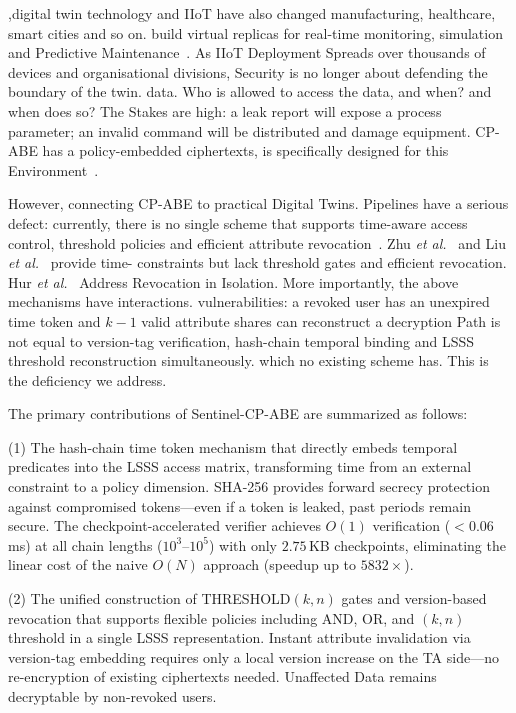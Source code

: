 \documentclass[lettersize,journal]{IEEEtran}
\newcommand{\etal}{\textit{et al.}}
\begin{document}
,digital twin technology and IIoT have also changed manufacturing, healthcare, smart cities and so on. build virtual replicas for real-time monitoring, simulation and Predictive Maintenance~\cite{Sharma2022, LiuM2021, Fuller2020_DT_Survey, Alhamam2025_DTCyber}. As IIoT Deployment Spreads over thousands of devices and organisational divisions, Security is no longer about defending the boundary of the twin. data. Who is allowed to access the data, and when? and when does so? The Stakes are high: a leak report will expose a process parameter; an invalid command will be distributed and damage equipment. CP-ABE has a policy-embedded ciphertexts, is specifically designed for this Environment~\cite{Zhang2021_ABESurvey, Iqal2024}.

However, connecting CP-ABE to practical Digital Twins. Pipelines have a serious defect: currently, there is no single scheme that supports time-aware access control, threshold policies and efficient attribute revocation~\cite{Aouedi2025_IoTSurvey, Sharma2026_IoTSecurity}. Zhu \etal~\cite{Zhu2012} and Liu \etal~\cite{Liu2018_ACNS} provide time- constraints but lack threshold gates and efficient revocation. Hur \etal~\cite{Hur2011} Address Revocation in Isolation. More importantly, the above mechanisms have interactions. vulnerabilities: a revoked user has an unexpired time token and $k-1$ valid attribute shares can reconstruct a decryption Path is not equal to version-tag verification, hash-chain temporal binding and LSSS threshold reconstruction simultaneously. which no existing scheme has. This is the deficiency we address.

The primary contributions of Sentinel-CP-ABE are summarized as follows:

(1) The hash-chain time token mechanism that directly embeds
temporal predicates into the LSSS access matrix, transforming
time from an external constraint to a policy dimension. SHA-256 provides
forward secrecy protection against compromised tokens---even if a token is leaked,
past periods remain secure. The checkpoint-accelerated verifier achieves
$O(1)$ verification ($<0.06$\,ms) at all chain lengths ($10^3$--$10^5$)
with only $2.75$\,KB checkpoints, eliminating the linear cost of the
naive $O(N)$ approach (speedup up to $5832\times$).

(2) The unified construction of THRESHOLD$(k,n)$ gates and version-based revocation
that supports flexible policies including AND, OR, and $(k,n)$ threshold in
a single LSSS representation. Instant attribute invalidation via version-tag
embedding requires only a local version increase on the TA side---no
re-encryption of existing ciphertexts needed. Unaffected Data remains
decryptable by non-revoked users.
\end{document}
